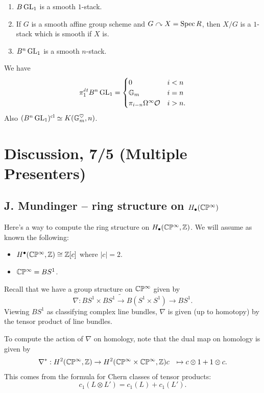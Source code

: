 \documentclass{amsart}
\begin{document}
\begin{ex}
	\begin{enumerate}
		\item $B\operatorname{GL}_1$ is a smooth $1$-stack.
		\item If $G$ is a smooth affine group scheme and $G \curvearrowright X = \operatorname{Spec} R$, then $X / G$ is a $1$-stack which is smooth if $X$ is.
		\item $B^n \operatorname{GL}_1$ is a smooth $n$-stack.
	\end{enumerate}
\end{ex}

\begin{rmk}
	We have
	\[
		\pi_1^{\acute{e}t} B^n \operatorname{GL}_1 = \begin{cases}
			0 & i < n \\
			\mathbb{G}_m & i = n \\
			\pi_{i-n} \Omega^\infty \mathcal{O} & i > n.
		\end{cases}
	\]
	Also $(B^n \operatorname{GL}_1)^{\mathrm{cl}} \simeq K(\mathbb{G}_m^\heartsuit, n)$.
\end{rmk}

\section{Discussion, 7/5 (Multiple Presenters)}

\subsection{J. Mundinger -- ring structure on $H_\bullet(\mathbb{C}\mathbb{P}^\infty)$}

Here's a way to compute the ring structure on $H_\bullet(\mathbb{C}\mathbb{P}^\infty, \mathbb{Z})$.
We will assume as known the following:
\begin{itemize}
	\item $H^\bullet(\mathbb{C}\mathbb{P}^\infty, \mathbb{Z}) \cong \mathbb{Z}[c]$ where $|c| = 2$.
	\item $\mathbb{C}\mathbb{P}^\infty = BS^1$.
\end{itemize}

Recall that we have a group structure on $\mathbb{C}\mathbb{P}^\infty$ given by
\[
	\nabla: BS^1 \times BS^1 \tilde{\to} B(S^1 \times S^1) \to BS^1.
\]
Viewing $BS^1$ as classifying complex line bundles, $\nabla$ is given (up to homotopy) by the tensor product of line bundles.

To compute the action of $\nabla$ on homology, note that the dual map on homology is given by
\begin{align*}
	\nabla^*: H^2(\mathbb{C}\mathbb{P}^\infty, \mathbb{Z}) &\to H^2(\mathbb{C}\mathbb{P}^\infty \times \mathbb{C}\mathbb{P}^\infty, \mathbb{Z})
	c &\mapsto c \otimes 1 + 1 \otimes c.
\end{align*}
This comes from the formula for Chern classes of tensor products: 
\[
	c_1(L \otimes L') = c_1(L) + c_1(L').
\]
\end{document}
